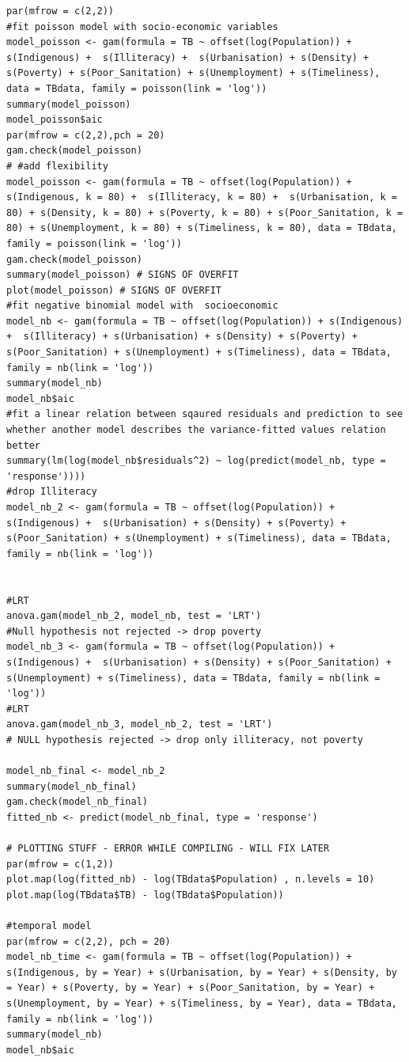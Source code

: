 \documentclass{article}
\begin{document}
\begin{verbatim}
par(mfrow = c(2,2))
#fit poisson model with socio-economic variables
model_poisson <- gam(formula = TB ~ offset(log(Population)) + s(Indigenous) +  s(Illiteracy) +  s(Urbanisation) + s(Density) + s(Poverty) + s(Poor_Sanitation) + s(Unemployment) + s(Timeliness), data = TBdata, family = poisson(link = 'log'))
summary(model_poisson)
model_poisson$aic
par(mfrow = c(2,2),pch = 20)
gam.check(model_poisson)
# #add flexibility
model_poisson <- gam(formula = TB ~ offset(log(Population)) + s(Indigenous, k = 80) +  s(Illiteracy, k = 80) +  s(Urbanisation, k = 80) + s(Density, k = 80) + s(Poverty, k = 80) + s(Poor_Sanitation, k = 80) + s(Unemployment, k = 80) + s(Timeliness, k = 80), data = TBdata, family = poisson(link = 'log'))
gam.check(model_poisson)
summary(model_poisson) # SIGNS OF OVERFIT
plot(model_poisson) # SIGNS OF OVERFIT
#fit negative binomial model with  socioeconomic
model_nb <- gam(formula = TB ~ offset(log(Population)) + s(Indigenous) +  s(Illiteracy) + s(Urbanisation) + s(Density) + s(Poverty) + s(Poor_Sanitation) + s(Unemployment) + s(Timeliness), data = TBdata, family = nb(link = 'log'))
summary(model_nb)
model_nb$aic
#fit a linear relation between sqaured residuals and prediction to see whether another model describes the variance-fitted values relation better
summary(lm(log(model_nb$residuals^2) ~ log(predict(model_nb, type = 'response'))))
#drop Illiteracy
model_nb_2 <- gam(formula = TB ~ offset(log(Population)) + s(Indigenous) +  s(Urbanisation) + s(Density) + s(Poverty) + s(Poor_Sanitation) + s(Unemployment) + s(Timeliness), data = TBdata, family = nb(link = 'log'))


#LRT
anova.gam(model_nb_2, model_nb, test = 'LRT')
#Null hypothesis not rejected -> drop poverty
model_nb_3 <- gam(formula = TB ~ offset(log(Population)) + s(Indigenous) +  s(Urbanisation) + s(Density) + s(Poor_Sanitation) + s(Unemployment) + s(Timeliness), data = TBdata, family = nb(link = 'log'))
#LRT
anova.gam(model_nb_3, model_nb_2, test = 'LRT')
# NULL hypothesis rejected -> drop only illiteracy, not poverty

model_nb_final <- model_nb_2
summary(model_nb_final)
gam.check(model_nb_final)
fitted_nb <- predict(model_nb_final, type = 'response')

# PLOTTING STUFF - ERROR WHILE COMPILING - WILL FIX LATER
par(mfrow = c(1,2))
plot.map(log(fitted_nb) - log(TBdata$Population) , n.levels = 10)
plot.map(log(TBdata$TB) - log(TBdata$Population))

#temporal model
par(mfrow = c(2,2), pch = 20)
model_nb_time <- gam(formula = TB ~ offset(log(Population)) + s(Indigenous, by = Year) + s(Urbanisation, by = Year) + s(Density, by = Year) + s(Poverty, by = Year) + s(Poor_Sanitation, by = Year) + s(Unemployment, by = Year) + s(Timeliness, by = Year), data = TBdata, family = nb(link = 'log'))
summary(model_nb)
model_nb$aic


\end{verbatim}
\end{document}
